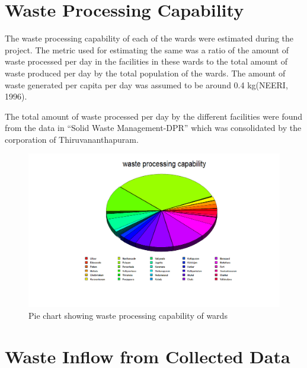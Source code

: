 \documentclass[12pt,a4paper]{  report}
\begin{document}
\section{Waste Processing Capability}

The waste processing capability of each of the wards were estimated during the project. The metric used for estimating the same was a ratio of the amount of waste processed per day  in the facilities in these wards to the total amount of waste produced  per day by the total population of the wards. 
The amount of waste generated per capita per day was assumed  to be around 0.4 kg(NEERI, 1996).

The total amount of waste processed per day by the different facilities were found from the data in “Solid Waste Management-DPR” which was consolidated by the corporation of Thiruvananthapuram.

\begin{figure}
	\centering
	\includegraphics[width=1\linewidth]{waste_processing}
	\caption{Pie chart showing waste processing capability of wards}
	\label{fig:wasteprocessing}
\end{figure}

\section{Waste Inflow from Collected Data}
\end{document}

